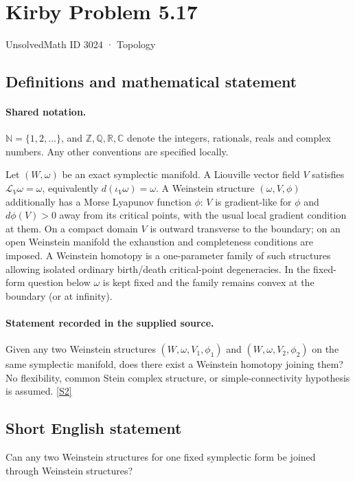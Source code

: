 \documentclass[11pt]{article}
\newcommand{\sref}[2]{\hyperlink{source:#1:#2}{[S#2]}}
\begin{document}
\setcounter{section}{3023}
\section{Kirby Problem 5.17}\label{3024}
{\small\sffamily UnsolvedMath ID 3024 · Topology}
\subsection{Definitions and mathematical statement}

\paragraph{Shared notation.}$\mathbb N=\{1,2,\ldots\}$, and $\mathbb Z,\mathbb Q,\mathbb R,\mathbb C$ denote the integers, rationals, reals and complex numbers. Any other conventions are specified locally.


Let $(W,\omega)$ be an exact symplectic manifold. A Liouville vector field $V$ satisfies $\mathcal L_V\omega=\omega$, equivalently $d(\iota_V\omega)=\omega$. A Weinstein structure $(\omega,V,\phi)$ additionally has a Morse Lyapunov function $\phi$: $V$ is gradient-like for $\phi$ and $d\phi(V)>0$ away from its critical points, with the usual local gradient condition at them. On a compact domain $V$ is outward transverse to the boundary; on an open Weinstein manifold the exhaustion and completeness conditions are imposed. A Weinstein homotopy is a one-parameter family of such structures allowing isolated ordinary birth/death critical-point degeneracies. In the fixed-form question below $\omega$ is kept fixed and the family remains convex at the boundary (or at infinity).
\paragraph{Statement recorded in the supplied source.}
Given any two Weinstein structures $(W,\omega,V_1,\phi_1)$ and $(W,\omega,V_2,\phi_2)$ on the same symplectic manifold, does there exist a Weinstein homotopy joining them? No flexibility, common Stein complex structure, or simple-connectivity hypothesis is assumed. \sref{3024}{2}
\subsection{Short English statement}
Can any two Weinstein structures for one fixed symplectic form be joined through Weinstein structures?
\end{document}
